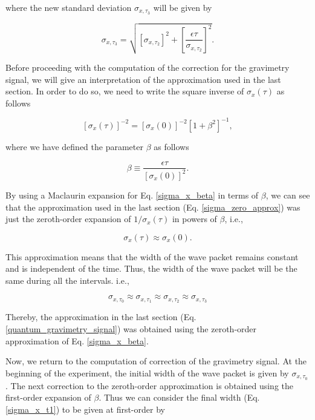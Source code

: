 \documentclass{article}
\begin{document}
where the new standard deviation $\sigma_{x, \tau_{3}}$ will be given by 

\begin{equation}\label{sigma_x_t3}
\sigma_{x, \tau_{3}} = \sqrt{[\sigma_{x, \tau_{2}}]^{2} + \left[\frac{\epsilon \tau}{\sigma_{x, \tau_{2}}} \right]^{2}}.
\end{equation}

Before proceeding with the computation of the correction for the gravimetry signal, we will give an interpretation of the approximation used in the last section. In order to do so, we need to write the square inverse of $\sigma_{x}(\tau)$ as follows

\begin{equation}\label{sigma_x_beta}
[\sigma_{x}(\tau)]^{-2} = [\sigma_{x}(0)]^{-2}\left[1 + \beta^{2}\right]^{-1},
\end{equation}

where we have defined the parameter $\beta$ as follows

\begin{equation}\label{beta_parameter}
\beta \equiv \frac{\epsilon \tau}{[\sigma_{x}(0)]^{2}}.
\end{equation}

By using a Maclaurin expansion for Eq. \ref{sigma_x_beta} in terms of $\beta$, we can see that the approximation used in the last section (Eq. \ref{sigma_zero_approx}) was just the zeroth-order expansion of $1/\sigma_{x}(\tau)$ in powers of $\beta$, i.e.,

\begin{equation}
\sigma_{x}(\tau) \approx \sigma_{x}(0).
\end{equation}

This approximation means that the width of the wave packet remains constant and is independent of the time. Thus, the width of the wave packet will be the same during all the intervals. i.e., 

\begin{equation}
\sigma_{x, \tau_{0}} \approx \sigma_{x, \tau_{1}} \approx \sigma_{x, \tau_{2}} \approx \sigma_{x, \tau_{3}} 
\end{equation}

Thereby, the approximation in the last section (Eq. \ref{quantum_gravimetry_signal}) was obtained using the zeroth-order approximation of Eq. \ref{sigma_x_beta}.
\vfill

Now, we return to the computation of correction of the gravimetry signal. At the beginning of the experiment, the initial width of the wave packet is given by $\sigma_{x, \tau_{0}}$. The next correction to the zeroth-order approximation is obtained using the first-order expansion of $\beta$. Thus we can consider the final width (Eq. \ref{sigma_x_t1}) to be given at first-order by
\end{document}
